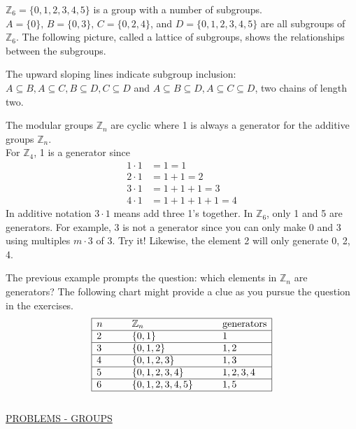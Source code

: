 \documentclass[12pt]{book}
\theoremstyle{definition}
\def\Z{\mathbb{Z}}
\begin{document}
\begin{tcexample}{}{}
$\Z_6 = \{0,1,2,3,4,5\}$ is a group with a number of subgroups.  $A=\{0\},\, B=\{0,3\},\, C=\{0,2,4\}$, and $D=\{0,1,2,3,4,5\}$ are all subgroups of $\Z_6$.  The following picture, called a lattice of subgroups, shows the relationships between the subgroups.
\centerline{}
The upward sloping lines indicate subgroup inclusion: $A\subseteq B, A\subseteq C, B\subseteq D, C\subseteq D$ and $A\subseteq B\subseteq D, A\subseteq C\subseteq D$, two chains of length two.
\end{tcexample}
\newpage
\begin{tcexample}{}{}
The modular groups $\Z_n$ are cyclic where 1 is always a generator for the additive groups $ \Z_n $.\\
For $\Z_4$, 1 is a generator since
\begin{equation*}\begin{split}
1\cdot 1&= 1=1\\
2\cdot 1 &=1+1=2\\
3\cdot 1 &=1+1+1 = 3\\
4\cdot 1 &=1+1+1+1 =4
\end{split}\end{equation*}
In additive notation $3\cdot 1$ means add three 1's together.  In $\Z_6$, only 1 and 5 are generators.  For example, 3 is not a generator since you can only make 0 and 3 using multiples $m\cdot3$ of 3.  Try it!  Likewise, the element 2 will only generate 0, 2, 4.  
\end{tcexample}
The previous example prompts the question: which elements in $\Z_n$ are generators?  The following chart might provide a clue as you pursue the question in the exercises.
$$\begin{array}{|lll|}
\hline
n \qquad& \Z_n & \text{generators}\\
\hline
2 & \{0,1\} & 1\\
\hline
3 & \{0,1,2\}  & 1,2\\
\hline
4 & \{0,1,2,3\} & 1,3\\
\hline
5 & \{0,1,2,3,4\} & 1,2,3,4\\
\hline
6 & \{0,1,2,3,4,5\}\qquad & 1, 5\\
\hline
\end{array}$$
~\\
\newpage
\underline{PROBLEMS - GROUPS}
\end{document}

